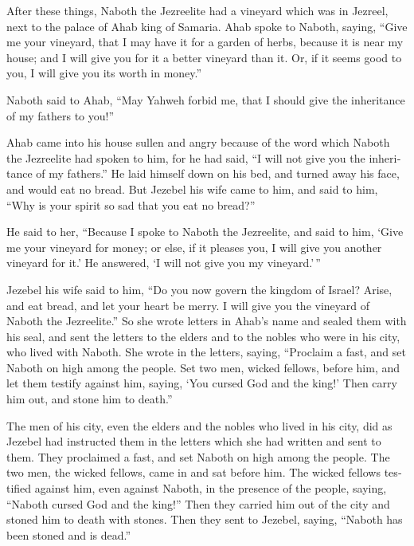 \begin{paracol}{2}
\begin{otherlanguage}{english}
 After these things, Naboth the Jezreelite had a vineyard
which was in Jezreel, next to the palace of Ahab king of Samaria.
 Ahab spoke to Naboth, saying, ``Give me your vineyard,
that I may have it for a garden of herbs, because it is near my house;
and I will give you for it a better vineyard than it. Or, if it seems
good to you, I will give you its worth in money.''

 Naboth said to Ahab, ``May Yahweh forbid me, that I
should give the inheritance of my fathers to you!''

 Ahab came into his house sullen and angry because of the
word which Naboth the Jezreelite had spoken to him, for he had said, ``I
will not give you the inheritance of my fathers.'' He laid himself down
on his bed, and turned away his face, and would eat no bread.
 But Jezebel his wife came to him, and said to him, ``Why
is your spirit so sad that you eat no bread?''

 He said to her, ``Because I spoke to Naboth the
Jezreelite, and said to him, `Give me your vineyard for money; or else,
if it pleases you, I will give you another vineyard for it.' He
answered, `I will not give you my vineyard.'\,''

 Jezebel his wife said to him, ``Do you now govern the
kingdom of Israel? Arise, and eat bread, and let your heart be merry. I
will give you the vineyard of Naboth the Jezreelite.''  So
she wrote letters in Ahab's name and sealed them with his seal, and sent
the letters to the elders and to the nobles who were in his city, who
lived with Naboth.  She wrote in the letters, saying,
``Proclaim a fast, and set Naboth on high among the people.
 Set two men, wicked fellows, before him, and let them
testify against him, saying, `You cursed God and the king!' Then carry
him out, and stone him to death.''

 The men of his city, even the elders and the nobles who
lived in his city, did as Jezebel had instructed them in the letters
which she had written and sent to them.  They proclaimed
a fast, and set Naboth on high among the people.  The two
men, the wicked fellows, came in and sat before him. The wicked fellows
testified against him, even against Naboth, in the presence of the
people, saying, ``Naboth cursed God and the king!'' Then they carried
him out of the city and stoned him to death with stones. 
Then they sent to Jezebel, saying, ``Naboth has been stoned and is
dead.''


\end{otherlanguage}
\end{paracol}
